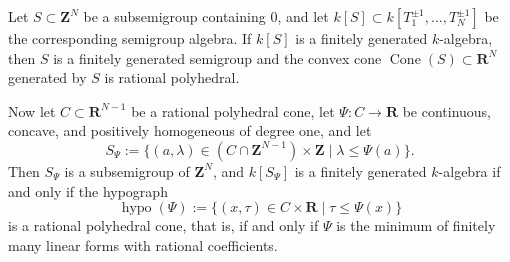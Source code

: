 \begin{proposition}
\label{prop:ch33-monomial-fg-criterion}
Let $S\subset\mathbf Z^N$ be a subsemigroup containing $0$, and let
$k[S]\subset k[T_1^{\pm1},\dots,T_N^{\pm1}]$ be the corresponding
semigroup algebra.  If $k[S]$ is a finitely generated $k$-algebra, then
$S$ is a finitely generated semigroup and the convex cone
$\operatorname{Cone}(S)\subset\mathbf R^N$ generated by $S$ is
rational polyhedral.

Now let $C\subset\mathbf R^{N-1}$ be a rational polyhedral cone, let
$\Psi:C\to\mathbf R$ be continuous, concave, and positively homogeneous
of degree one, and let
\begin{equation}
\label{eq:ch33-hypograph-semigroup}
 S_\Psi:=\{(a,\lambda)\in(C\cap\mathbf Z^{N-1})\times\mathbf Z
            \mid\lambda\leq\Psi(a)\}.
\end{equation}
Then $S_\Psi$ is a subsemigroup of $\mathbf Z^N$, and
$k[S_\Psi]$ is a finitely generated $k$-algebra if and only if the
hypograph
\begin{equation}
\label{eq:ch33-hypograph}
 \operatorname{hypo}(\Psi)
 :=\{(x,\tau)\in C\times\mathbf R\mid\tau\leq\Psi(x)\}
\end{equation}
is a rational polyhedral cone, that is, if and only if $\Psi$ is the
minimum of finitely many linear forms with rational coefficients.
\end{proposition}

